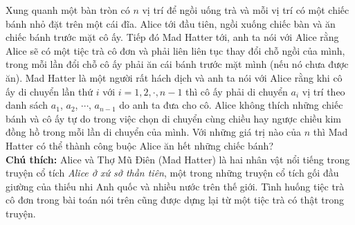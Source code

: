 \begin{ex}%
	Xung quanh một bàn tròn có $n$ vị trí để ngồi uống trà và mỗi vị trí có một chiếc bánh nhỏ đặt trên một cái đĩa. Alice tới đầu tiên, ngồi xuống chiếc bàn và ăn chiếc bánh trước mặt cô ấy. Tiếp đó Mad Hatter tới, anh ta nói với Alice rằng Alice sẽ có một tiệc trà cô đơn và phải liên liên tục thay đổi chỗ ngồi của mình, trong mỗi lần đổi chỗ cô ấy phải ăn cái bánh trước mặt mình (nếu nó chưa được ăn). Mad Hatter là một người rất hách dịch và anh ta nói với Alice rằng khi cô ấy di chuyển lần thứ $i$ với $i=1,2,\cdot,n-1$ thì cô ấy phải di chuyển $a_i$ vị trí theo danh sách $a_1$, $a_2$, $\cdots$, $a_{n-1}$ do anh ta đưa cho cô. Alice không thích những chiếc bánh và cô ấy tự do trong việc chọn di chuyển cùng chiều hay ngược chiều kim đồng hồ trong mỗi lần di chuyển của mình. Với những giá trị nào của $n$ thì Mad Hatter có thể thành công buộc Alice ăn hết những chiếc bánh?\\
{\bf Chú thích:} Alice và Thợ Mũ Điên (Mad Hatter) là hai nhân vật nổi tiếng trong truyện cổ tích {\it Alice ở xứ sở thần tiên}, một trong những truyện cổ tích gối đầu giường của thiếu nhi Anh quốc và nhiều nước trên thế giới. Tình huống tiệc trà cô đơn trong bài toán nói trên cũng được dựng lại từ một tiệc trà có thật trong truyện.
\end{ex}
